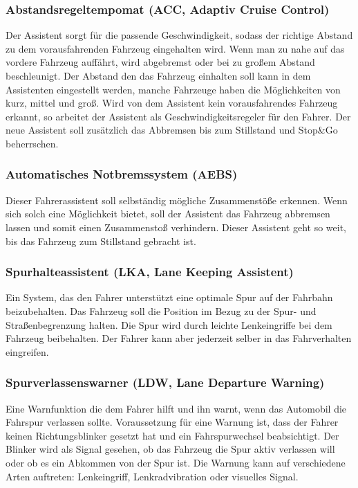         \subsubsection{Abstandsregeltempomat (ACC, Adaptiv Cruise Control)}
        Der Assistent sorgt für die passende Geschwindigkeit, sodass der richtige Abstand
        zu dem vorausfahrenden Fahrzeug eingehalten wird. Wenn man zu nahe auf das vordere
        Fahrzeug auffährt, wird abgebremst oder bei zu großem Abstand beschleunigt. Der Abstand
        den das Fahrzeug einhalten soll kann in dem Assistenten eingestellt werden, manche Fahrzeuge
        haben die Möglichkeiten von kurz, mittel und groß. Wird von dem Assistent kein vorausfahrendes
        Fahrzeug erkannt, so arbeitet der Assistent als Geschwindigkeitsregeler für den Fahrer. Der
        neue Assistent soll zusätzlich das Abbremsen bis zum Stillstand und Stop\&Go beherrschen.
        ~\cite{assistenzsysteme.PB2} ~\cite{Audi.PB1}

        \subsubsection{Automatisches Notbremssystem (AEBS)}
        Dieser Fahrerassistent soll selbständig mögliche Zusammenstöße erkennen. Wenn sich solch
        eine Möglichkeit bietet, soll der Assistent das Fahrzeug abbremsen lassen und somit einen
        Zusammenstoß verhindern. Dieser Assistent geht so weit, bis das Fahrzeug zum Stillstand 
        gebracht ist.
        ~\cite{notbremsassi.PB1} ~\cite{assistenzsysteme.PB1}  ~\cite{assistenzsysteme.PB2}
        ~\cite{notbremsassi.PB2}
        
        \subsubsection{Spurhalteassistent (LKA, Lane Keeping Assistent)}
        Ein System, das den Fahrer unterstützt eine optimale Spur auf der Fahrbahn beizubehalten.
        Das Fahrzeug soll die Position im Bezug zu der Spur- und Straßenbegrenzung halten. Die
        Spur wird durch leichte Lenkeingriffe bei dem Fahrzeug beibehalten. Der Fahrer kann aber
        jederzeit selber in das Fahrverhalten eingreifen.
        ~\cite{spurhalte.PB1} ~\cite{assistenzsysteme.PB1} ~\cite{spurhalte.PB2}  ~\cite{assistenzsysteme.PB2}

        \subsubsection{Spurverlassenswarner (LDW, Lane Departure Warning)}
        Eine Warnfunktion die dem Fahrer hilft und ihn warnt, wenn das Automobil die Fahrspur
        verlassen sollte. Voraussetzung für eine Warnung ist, dass der Fahrer keinen Richtungsblinker
        gesetzt hat und ein Fahrspurwechsel beabsichtigt. Der Blinker wird als Signal gesehen, ob das 
        Fahrzeug die Spur aktiv verlassen will oder ob es ein Abkommen von der Spur ist. Die 
        Warnung kann auf verschiedene Arten auftreten: Lenkeingriff, Lenkradvibration oder visuelles
        Signal.
        ~\cite{assistenzsysteme.PB2} ~\cite{LDW.PB1}

